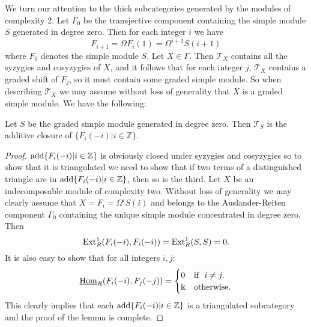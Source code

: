 \documentclass[10pt]{amsart}
\begin{document}
\noindent We turn our attention to the thick subcategories generated by the modules of complexity 2. 
Let $\Gamma_0$ be the transjective component 
containing the simple module $S$ generated in degree zero. 
Then for each integer $i$ we have $$F_{i+1}=\Omega F_i(1)=\Omega^{i+1}S(i+1)$$ 
\noindent where $F_0$ denotes the simple module $S$. Let $X\in\Gamma$. Then $\mathcal T_X$ contains 
all the syzygies and cosyzygies of $X$, and it follows that for each integer $j$, 
$\mathcal T_X$ contains a graded shift of $F_j$, so it must contain some graded simple module. 
So when describing $\mathcal T_X$ we may assume without loss of generality that $X$ is a graded 
simple module. We have the following:

\begin{lemma} Let $S$ be the graded simple module generated in degree zero. 
Then $\mathcal T_S$ is the additive closure of $\{F_i(-i)|i\in\mathbb Z\}$.
\end{lemma}

\begin{proof} $\operatorname{add}\{F_i(-i)|i\in\mathbb Z\}$ is obviously closed under syzygies and 
cosyzygies so to show that it is triangulated we 
need to show that if two terms of a distinguished triangle are in $\operatorname{add}\{F_i(-i)|i\in\mathbb Z\}$, 
then so is the third. {Let $X$ be an indecomposable module of complexity two. Without loss of generality we may clearly 
assume that $X=F_i=\Omega^iS(i)$ and belongs to the Auslander-Reiten component $\Gamma_0$ containing the 
unique simple module concentrated in degree zero.  Then $$\operatorname{Ext}\nolimits^1_R(F_i(-i),F_i(-i))=\operatorname{Ext}\nolimits^1_R(S,S)=0.$$ 
\noindent It is also easy to show that for all integers $i,j$:
$$\underline{\operatorname{Hom}}_R(F_i(-i),F_j(-j))=
\begin{cases}
     0 & \text{if}\ \ i\ne j. \\
     \Bbbk & \text{otherwise}.
\end{cases}$$
This clearly implies that each  $\operatorname{add}\{F_i(-i)|i\in\mathbb Z\}$ is a triangulated subcategory 
and the proof of the lemma is complete.}
\end{proof}
\end{document}

